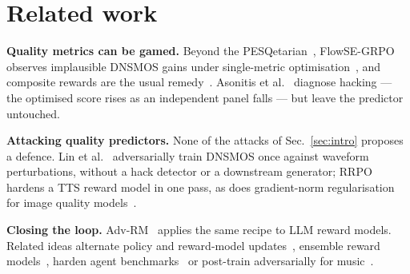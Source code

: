 \documentclass[conference]{IEEEtran}
\begin{document}
\section{Related work}
\label{sec:related}
\noindent\textbf{Quality metrics can be gamed.} Beyond the PESQetarian~\cite{deoliveira2024pesqetarian}, %
FlowSE-GRPO observes implausible DNSMOS gains under single-metric
optimisation~\cite{wang2026flowsegrpo}, and composite rewards are the usual
remedy~\cite{berdoz2026gspo,wang2025sqase}. Asonitis et al.~\cite{asonitis2026limits} diagnose hacking --- the
optimised score rises as an independent panel falls --- but leave the predictor untouched.

\noindent\textbf{Attacking quality predictors.} None of the attacks of Sec.~\ref{sec:intro} proposes a
defence. Lin et al.~\cite{lin2022robustness} adversarially train DNSMOS once against waveform perturbations,
without a hack detector or a downstream generator; RRPO~\cite{wang2026rrpo} hardens a TTS reward model in one
pass, as does gradient-norm regularisation for image quality models~\cite{liu2024iqadefense}.

\noindent\textbf{Closing the loop.} Adv-RM~\cite{bukharin2025advrm} applies the same recipe to LLM reward models. Related ideas alternate policy and reward-model
updates~\cite{cheng2024apo,hong2025cooper,wolf2025iterated}, ensemble reward
models~\cite{coste2024ensembles,eisenstein2024helping}, harden agent benchmarks~\cite{zhong2026hackerfixer} or
post-train adversarially for music~\cite{wu2026gapt}.
\end{document}
